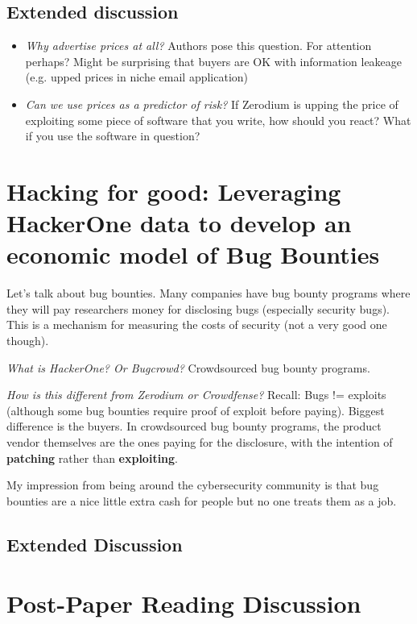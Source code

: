 \documentclass[11pt]{article}
\begin{document}
\subsection{Extended discussion}


\begin{itemize}
    \item {\it Why advertise prices at all?} Authors pose this question. For attention perhaps? Might be surprising that buyers are OK with information leakeage (e.g. upped prices in niche email application)
    \item {\it Can we use prices as a predictor of risk?} If Zerodium is upping the price of exploiting some piece of software that you write, how should you react? What if you use the software in question?
\end{itemize}

\section{Hacking for good: Leveraging HackerOne data to develop an economic model of Bug Bounties}

Let's talk about bug bounties. Many companies have bug bounty programs where they will pay researchers money for disclosing bugs (especially security bugs). This is a mechanism for measuring the costs of security (not a very good one though).

{\it What is HackerOne? Or Bugcrowd?} Crowdsourced bug bounty programs. 

{\it How is this different from Zerodium or Crowdfense?} Recall: Bugs != exploits (although some bug bounties require proof of exploit before paying). Biggest difference is the buyers. In crowdsourced bug bounty programs, the product vendor themselves are  the ones paying for the disclosure, with the intention of {\bf patching} rather than {\bf exploiting}.

My impression from being around the cybersecurity community is that bug bounties are a nice little extra cash for people but no one treats them as a job. 


\subsection{Extended Discussion} 

\section{Post-Paper Reading Discussion} 
\end{document}
